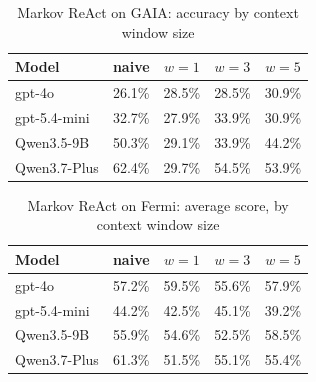 \documentclass{article}
\begin{document}
\begin{table}[h]
\centering
\caption{Markov ReAct on GAIA: accuracy by context window size}
\label{tab:markov-react-gaia}
\begin{tabular}{lcccc}
\toprule
Model & naive & $w{=}1$ & $w{=}3$ & $w{=}5$ \\
\midrule
gpt-4o        & 26.1\% & 28.5\% & 28.5\% & 30.9\% \\
gpt-5.4-mini  & 32.7\% & 27.9\% & 33.9\% & 30.9\% \\
Qwen3.5-9B    & 50.3\% & 29.1\% & 33.9\% & 44.2\% \\
Qwen3.7-Plus  & 62.4\% & 29.7\% & 54.5\% & 53.9\% \\
\bottomrule
\end{tabular}
\end{table}

\begin{table}[h]
\centering
\caption{Markov ReAct on Fermi: average score, by context window size}
\label{tab:markov-react-fermi}
\begin{tabular}{lcccc}
\toprule
Model & naive & $w{=}1$ & $w{=}3$ & $w{=}5$ \\
\midrule
gpt-4o        & 57.2\% & 59.5\% & 55.6\% & 57.9\% \\
gpt-5.4-mini  & 44.2\% & 42.5\% & 45.1\% & 39.2\% \\
Qwen3.5-9B    & 55.9\% & 54.6\% & 52.5\% & 58.5\% \\
Qwen3.7-Plus  & 61.3\% & 51.5\% & 55.1\% & 55.4\% \\
\bottomrule
\end{tabular}
\end{table}
\end{document}
